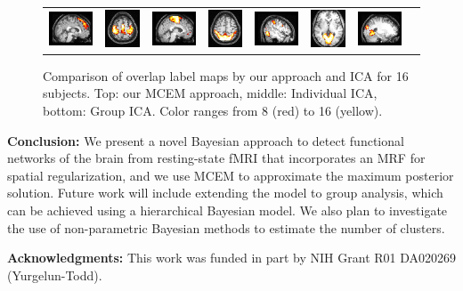 \documentclass[runningheads, a4paper]{llncs}
\begin{document}
\begin{figure}[!t]
\begin{center}
\begin{tabular}{cccccccc}
      \includegraphics[height=0.10\textwidth]{figures/workshop/ica_single/dmn_s} &
      \vspace{1pt}
      \includegraphics[height=0.10\textwidth]{figures/workshop/ica_single/motor_a} &
      \includegraphics[height=0.10\textwidth]{figures/workshop/ica_single/motor_s} &
      \vspace{1pt}
      \includegraphics[height=0.10\textwidth]{figures/workshop/ica_single/atten_a} &
      \includegraphics[height=0.10\textwidth]{figures/workshop/ica_single/atten_s} &
      \vspace{1pt}
      \includegraphics[height=0.10\textwidth]{figures/workshop/ica_single/visual_a} &
      \includegraphics[height=0.10\textwidth]{figures/workshop/ica_single/visual_s} 
    \end{tabular}
  \end{center}
  \caption{Comparison of overlap label maps by our approach and ICA for 16
    subjects. Top: our MCEM approach, middle: Individual ICA, bottom: Group
    ICA. Color ranges from 8 (red) to 16 (yellow).}
  \label{fig:multisub}
\end{figure}


\noindent\textbf{Conclusion: } We present a novel Bayesian approach to detect
functional networks of the brain from resting-state fMRI that incorporates an
MRF for spatial regularization, and we use MCEM to approximate the maximum
posterior solution. Future work will include extending the model to group
analysis, which can be achieved using a hierarchical Bayesian model. We also
plan to investigate the use of non-parametric Bayesian methods to estimate the
number of clusters.\\%
\label{sec:conc}

\noindent\textbf{Acknowledgments: }
This work was funded in part by NIH Grant R01 DA020269 (Yurgelun-Todd).




\end{document}
